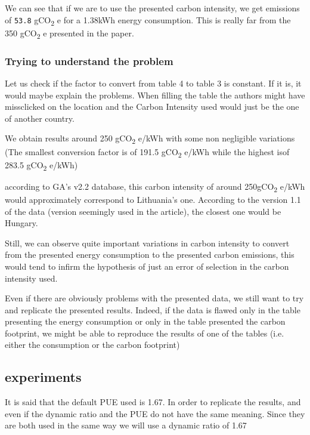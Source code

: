 \documentclass[11pt]{article}
\begin{document}
We can see that if we are to use the presented carbon intensity, we
get emissions of 
\texttt{53.8} gCO\textsubscript{2} e for a 1.38kWh energy consumption. This is
really far from the 350 gCO\textsubscript{2} e presented in the paper.

\subsubsection{Trying to understand the problem}
\label{sec:org712c1f4}

Let us check if the factor to convert from table 4 to table 3 is
constant.
If it is, it would maybe explain the problems. When filling the table
the authors might have missclicked on the location and the Carbon
Intensity used would just be the one of another country.

We obtain results around 250 gCO\textsubscript{2} e/kWh with some non negligible
variations (The smallest conversion factor is of 191.5 gCO\textsubscript{2} e/kWh
while the highest isof 283.5 gCO\textsubscript{2} e/kWh)

according to GA's v2.2 database, this carbon intensity of around 250gCO\textsubscript{2}
e/kWh would approximately correspond to Lithuania's one. According to
the version 1.1 of the data (version seemingly used in the article),
the closest one would be Hungary.

Still, we can observe quite important variations in carbon intensity
to convert from the presented energy consumption to the presented
carbon emissions, this would tend to infirm the hypothesis of just an
error of selection in the carbon intensity used. 

Even if there are obviously problems with the presented data, we still
want to try and replicate the presented results. Indeed, if the data
is flawed only in the table presenting the energy consumption or only
in the table presented the carbon footprint, we might be able to
reproduce the results of one of the tables (i.e. either the
consumption or the carbon footprint)

\subsection{experiments}
\label{sec:orgfd3384f}
It is said that the default PUE used is 1.67. In order to replicate
the results, and even if the dynamic ratio and the PUE do not have the
same meaning. Since they are both used in the same way we will use a
dynamic ratio of 1.67
\end{document}
